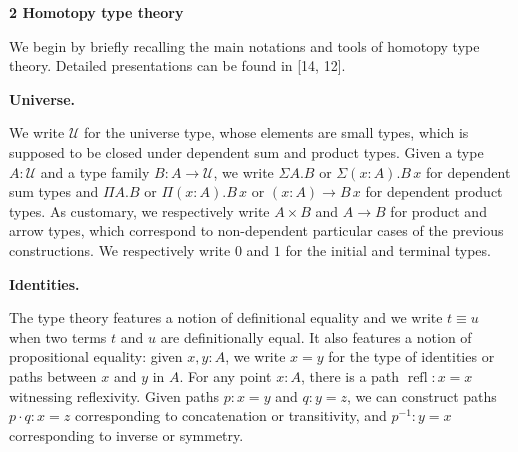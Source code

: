 
 
\par\medskip\noindent\textbf{2 Homotopy type theory}\par
 
 
We begin by briefly recalling the main notations and tools of homotopy type theory. Detailed presentations can be found in [14, 12].\par
 
 
 
\par\medskip\noindent\textbf{Universe.}\par
 
 
We write $\mathcal{U}$ for the universe type, whose elements are small types, which is supposed to be closed under dependent sum and product types. Given a type $A:\mathcal{U}$ and a type family $B:A\to\mathcal{U}$, we write $\Sigma A.B$ or $\Sigma(x:A).B\,x$ for dependent sum types and $\Pi A.B$ or $\Pi(x:A).B\,x$ or $(x:A)\to B\,x$ for dependent product types. As customary, we respectively write $A\times B$ and $A\to B$ for product and arrow types, which correspond to non-dependent particular cases of the previous constructions. We respectively write $0$ and $1$ for the initial and terminal types.\par
 
 
 
 
\par\medskip\noindent\textbf{Identities.}\par
 
 
The type theory features a notion of definitional equality and we write $t\equiv u$ when two terms $t$ and $u$ are definitionally equal. It also features a notion of propositional equality: given $x,y:A$, we write $x=y$ for the type of identities or paths between $x$ and $y$ in $A$. For any point $x:A$, there is a path $\operatorname{refl}:x=x$ witnessing reflexivity. Given paths $p:x=y$ and $q:y=z$, we can construct paths $p\cdot q:x=z$ corresponding to concatenation or transitivity, and $p^{-1}:y=x$ corresponding to inverse or symmetry.\par
 
